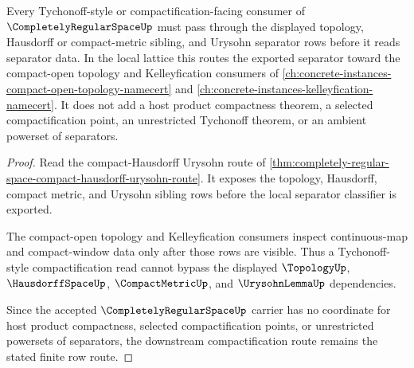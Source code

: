 \begin{theorem}
\label{thm:completely-regular-space-tychonoff-link}
Every Tychonoff-style or compactification-facing consumer of $\CompletelyRegularSpaceUp$ must pass through the displayed topology, Hausdorff or compact-metric sibling, and Urysohn separator rows before it reads separator data. In the local lattice this routes the exported separator toward the compact-open topology and Kelleyfication consumers of \autoref{ch:concrete-instances-compact-open-topology-namecert} and \autoref{ch:concrete-instances-kelleyfication-namecert}. It does not add a host product compactness theorem, a selected compactification point, an unrestricted Tychonoff theorem, or an ambient powerset of separators.
\end{theorem}
\begin{proof}
Read the compact-Hausdorff Urysohn route of \autoref{thm:completely-regular-space-compact-hausdorff-urysohn-route}. It exposes the topology, Hausdorff, compact metric, and Urysohn sibling rows before the local separator classifier is exported.

The compact-open topology and Kelleyfication consumers inspect continuous-map and compact-window data only after those rows are visible. Thus a Tychonoff-style compactification read cannot bypass the displayed $\TopologyUp$, $\HausdorffSpaceUp$, $\CompactMetricUp$, and $\UrysohnLemmaUp$ dependencies.

Since the accepted $\CompletelyRegularSpaceUp$ carrier has no coordinate for host product compactness, selected compactification points, or unrestricted powersets of separators, the downstream compactification route remains the stated finite row route.
\end{proof}
